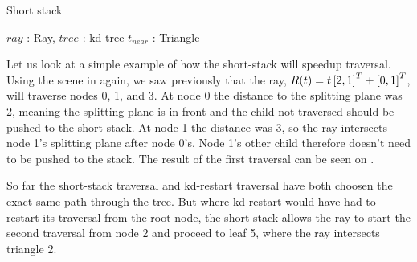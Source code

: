 \begin{algorithm}
  \caption{Short stack}
  \label{alg:ShortStack}
  \begin{algorithmic}
              {$ray$ : Ray, $tree$ : kd-tree}
              {$t_{near}$ : Triangle}{
      \ELSE
      \ENDIF
          \ENDIF
        \ELSE
        \ENDIF
      \ENDWHILE
      \ELSE
      \ENDIF
    \ENDWHILE
              }
  \end{algorithmic}
\end{algorithm}


Let us look at a simple example of how the short-stack will speedup
traversal. Using the scene in  again, we saw
previously that the ray, $R(t) = t \left[2, 1 \right]^T + \left[0, 1 \right]^T$, will
traverse nodes 0, 1, and 3. At node 0 the distance to the splitting plane was 2,
meaning the splitting plane is in front and the child not traversed should be
pushed to the short-stack. At node 1 the distance was 3, so the ray intersects
node 1's splitting plane after node 0's. Node 1's other child therefore doesn't
need to be pushed to the stack. The result of the first traversal can be seen on
.

So far the short-stack traversal and kd-restart traversal have both choosen the
exact same path through the tree. But where kd-restart would have had to restart
its traversal from the root node, the short-stack allows the ray to start the
second traversal from node 2 and proceed to leaf 5, where the ray intersects
triangle 2.

